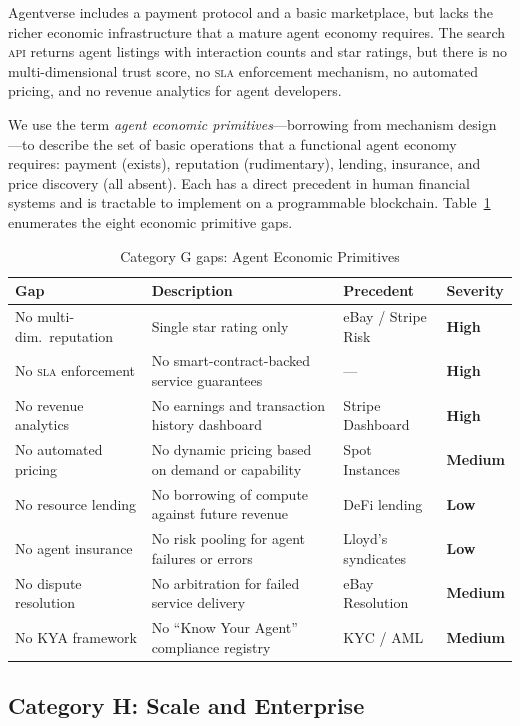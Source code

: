 \documentclass[twoside,11pt]{article}
\newcommand{\high}{\textcolor{red!70!black}{\textbf{High}}}
\newcommand{\medium}{\textcolor{orange!80!black}{\textbf{Medium}}}
\newcommand{\low}{\textcolor{green!50!black}{\textbf{Low}}}
\begin{document}
Agentverse includes a payment protocol and a basic marketplace, but lacks the
richer economic infrastructure that a mature agent economy requires.  The
search \textsc{api} returns agent listings with interaction counts and star
ratings, but there is no multi-dimensional trust score, no \textsc{sla}
enforcement mechanism, no automated pricing, and no revenue analytics for
agent developers.

We use the term \emph{agent economic primitives}---borrowing from mechanism
design \citep{myerson2007mechanism}---to describe the set of basic operations
that a functional agent economy requires: payment (exists), reputation
(rudimentary), lending, insurance, and price discovery (all absent).  Each has
a direct precedent in human financial systems and is tractable to implement on
a programmable blockchain.  Table~\ref{tab:gap-economy} enumerates the eight
economic primitive gaps.

\begin{table}[htbp]
\centering
\caption{Category G gaps: Agent Economic Primitives}
\label{tab:gap-economy}
\begin{tabular}{p{3.2cm} p{5.5cm} p{2.9cm} l}
\toprule
\textbf{Gap} & \textbf{Description} & \textbf{Precedent} &
\textbf{Severity} \\
\midrule
No multi-dim.\ reputation & Single star rating only & eBay / Stripe Risk &
\high \\[4pt]
No \textsc{sla} enforcement & No smart-contract-backed service guarantees & ---
& \high \\[4pt]
No revenue analytics & No earnings and transaction history dashboard & Stripe
Dashboard & \high \\[4pt]
No automated pricing & No dynamic pricing based on demand or capability & Spot
Instances & \medium \\[4pt]
No resource lending & No borrowing of compute against future revenue & DeFi
lending & \low \\[4pt]
No agent insurance & No risk pooling for agent failures or errors & Lloyd's
syndicates & \low \\[4pt]
No dispute resolution & No arbitration for failed service delivery & eBay
Resolution & \medium \\[4pt]
No KYA framework & No ``Know Your Agent'' compliance registry & KYC / AML &
\medium \\
\bottomrule
\end{tabular}
\end{table}

\subsection{Category H: Scale and Enterprise}
\label{subsec:gap-enterprise}
\end{document}
